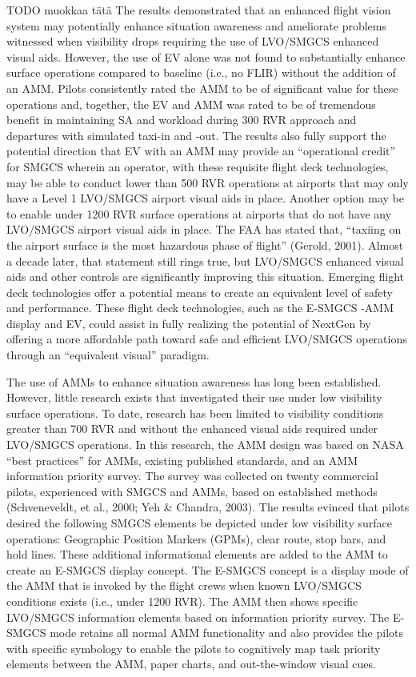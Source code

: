 \documentclass[utf8,bachelor,manualbib]{gradu3}
\begin{document}
TODO muokkaa tätä
The results demonstrated that an enhanced flight vision system may potentially enhance situation awareness and ameliorate problems witnessed when visibility drops requiring the use of LVO/SMGCS enhanced visual aids. However, the use of EV alone was not found to substantially enhance surface operations compared to baseline (i.e., no FLIR) without the addition of an AMM. Pilots consistently rated the AMM to be of significant value for these operations and, together, the EV and AMM was rated to be of tremendous benefit in maintaining SA and workload during 300 RVR approach and departures with simulated taxi-in and -out. The results also fully support the potential direction that EV with an AMM may provide an “operational credit” for SMGCS wherein an operator, with these requisite flight deck technologies, may be able to conduct lower than 500 RVR operations at airports that may only have a Level 1 LVO/SMGCS airport visual aids in place. Another option may be to enable under 1200 RVR surface operations at airports that do not have any LVO/SMGCS airport visual aids in place.
The FAA has stated that, “taxiing on the airport surface is the most hazardous phase of flight” (Gerold, 2001). Almost a decade later, that statement still rings true, but LVO/SMGCS enhanced visual aids and other controls are significantly improving this situation. Emerging flight deck technologies offer a potential means to create an equivalent level of safety and performance. These flight deck technologies, such as the E-SMGCS -AMM display and EV, could assist in fully realizing the potential of NextGen by offering a more affordable path toward safe and efficient LVO/SMGCS operations through an “equivalent visual” paradigm.\citep{prinzel2013}

The use of AMMs to enhance situation awareness has long been established. However, little research exists that
investigated their use under low visibility surface operations. To date, research has been limited to visibility
conditions greater than 700 RVR and without the enhanced visual aids required under LVO/SMGCS operations.
In this research, the AMM design was based on NASA “best practices” for AMMs, existing published standards,
and an AMM information priority survey. The survey was collected on twenty commercial pilots, experienced with
SMGCS and AMMs, based on established methods (Schveneveldt, et al., 2000; Yeh \& Chandra, 2003). The results
evinced that pilots desired the following SMGCS elements be depicted under low visibility surface operations: Geographic Position Markers (GPMs), clear route, stop bars, and hold lines. These additional informational elements are added to the AMM to create an E-SMGCS display concept.
The E-SMGCS concept is a display mode of the AMM that is invoked by the flight crews when known LVO/SMGCS conditions exists (i.e., under 1200 RVR). The AMM then shows specific LVO/SMGCS information elements based on information priority survey. The E-SMGCS mode retains all normal AMM functionality and also provides the pilots with specific symbology to enable the pilots to cognitively map task priority elements between the AMM, paper charts, and out-the-window visual cues.
\end{document}
